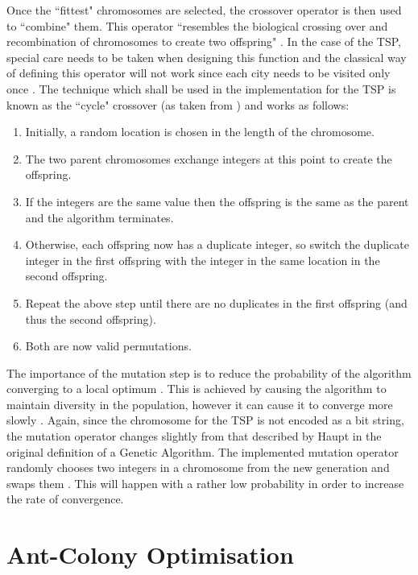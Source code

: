 \documentclass[11pt,a4paper,final]{article}
\begin{document}
	\par Once the ``fittest" chromosomes are selected, the crossover operator is then used to ``combine" them. This operator ``resembles the biological crossing over and recombination of chromosomes to create two offspring" \cite{GeneticAlgorithms}. In the case of the TSP, special care needs to be taken when designing this function and the classical way of defining this operator will not work since each city needs to be visited only once \cite{Haupt}. The technique which shall be used in the implementation for the TSP is known as the ``cycle" crossover (as taken from \cite{GeneticAlgorithms}) and works as follows:
	\begin{enumerate}
		\item Initially, a random location is chosen in the length of the chromosome.
		\item The two parent chromosomes exchange integers at this point to create the offspring.
		\item If the integers are the same value then the offspring is the same as the parent and the algorithm terminates.
		\item Otherwise, each offspring now has a duplicate integer, so switch the duplicate integer in the first offspring with the integer in the same location in the second offspring.
		\item Repeat the above step until there are no duplicates in the first offspring (and thus the second offspring).
		\item Both are now valid permutations.
	\end{enumerate}
	\par The importance of the mutation step is to reduce the probability of the algorithm converging to a local optimum \cite{Haupt}. This is achieved by causing the algorithm to maintain diversity in the population, however it can cause it to converge more slowly \cite{GeneticAlgorithms}. Again, since the chromosome for the TSP is not encoded as a bit string, the mutation operator changes slightly from that described by Haupt in the original definition of a Genetic Algorithm. The implemented mutation operator randomly chooses two integers in a chromosome from the new generation and swaps them \cite{GeneticAlgorithms}. This will happen with a rather low probability in order to increase the rate of convergence.
	
	\section{Ant-Colony Optimisation}
	\label{ACO}
	
\end{document}
